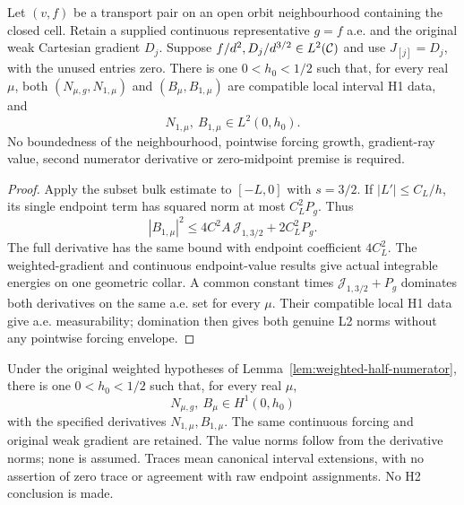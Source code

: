 \begin{lemma}
\label{lem:weighted-half-numerator}
\leanok
Let $(v,f)$ be a transport pair on an open orbit neighbourhood containing
the closed cell. Retain a supplied continuous representative $g=f$ a.e.
and the original weak Cartesian gradient $D_j$.
Suppose $f/d^2,D_j/d^{3/2}\in L^2(\mathcal{C})$ and use $J_{[j]}=D_j$,
with the unused entries zero.
There is one $0<h_0<1/2$ such that, for every real $\mu$, both
$(N_{\mu,g},N_{1,\mu})$ and $(B_\mu,B_{1,\mu})$ are compatible local
interval H1 data, and
\[
 N_{1,\mu},\ B_{1,\mu}\in L^2(0,h_0).
\]
No boundedness of the neighbourhood, pointwise forcing growth, gradient-ray
value, second numerator derivative or zero-midpoint premise is required.
\end{lemma}

\begin{proof}
\leanok
Apply the subset bulk estimate to $[-L,0]$ with $s=3/2$.
If $|L'|\le C_L/h$, its single endpoint term has squared norm at most
$C_L^2P_g$. Thus
\[
 |B_{1,\mu}|^2\le4C^2A\,\mathcal J_{1,3/2}+2C_L^2P_g .
\]
The full derivative has the same bound with endpoint coefficient $4C_L^2$.
The weighted-gradient and continuous endpoint-value results give actual
integrable energies on one geometric collar.
A common constant times $\mathcal J_{1,3/2}+P_g$ dominates both derivatives
on the same a.e. set for every $\mu$.
Their compatible local H1 data give a.e. measurability; domination then gives
both genuine L2 norms without any pointwise forcing envelope.
\end{proof}

\begin{lemma}
\label{lem:weighted-numerators-h1}
\leanok
Under the original weighted hypotheses of
Lemma~\ref{lem:weighted-half-numerator}, there is one $0<h_0<1/2$ such that,
for every real $\mu$,
\[
 N_{\mu,g},\ B_\mu\in H^1(0,h_0)
\]
with the specified derivatives $N_{1,\mu},B_{1,\mu}$.
The same continuous forcing and original weak gradient are retained.
The value norms follow from the derivative norms; none is assumed.
Traces mean canonical interval extensions, with no assertion of zero trace
or agreement with raw endpoint assignments. No H2 conclusion is made.
\end{lemma}

